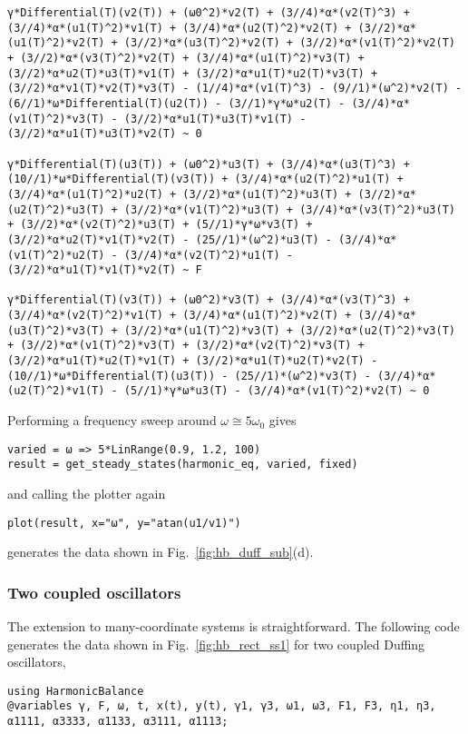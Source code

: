 \begin{lstlisting}[numbers=none, basicstyle=\scriptsize\ttfamily]
γ*Differential(T)(v2(T)) + (ω0^2)*v2(T) + (3//4)*α*(v2(T)^3) + (3//4)*α*(u1(T)^2)*v1(T) + (3//4)*α*(u2(T)^2)*v2(T) + (3//2)*α*(u1(T)^2)*v2(T) + (3//2)*α*(u3(T)^2)*v2(T) + (3//2)*α*(v1(T)^2)*v2(T) + (3//2)*α*(v3(T)^2)*v2(T) + (3//4)*α*(u1(T)^2)*v3(T) + (3//2)*α*u2(T)*u3(T)*v1(T) + (3//2)*α*u1(T)*u2(T)*v3(T) + (3//2)*α*v1(T)*v2(T)*v3(T) - (1//4)*α*(v1(T)^3) - (9//1)*(ω^2)*v2(T) - (6//1)*ω*Differential(T)(u2(T)) - (3//1)*γ*ω*u2(T) - (3//4)*α*(v1(T)^2)*v3(T) - (3//2)*α*u1(T)*u3(T)*v1(T) - (3//2)*α*u1(T)*u3(T)*v2(T) ~ 0

γ*Differential(T)(u3(T)) + (ω0^2)*u3(T) + (3//4)*α*(u3(T)^3) + (10//1)*ω*Differential(T)(v3(T)) + (3//4)*α*(u2(T)^2)*u1(T) + (3//4)*α*(u1(T)^2)*u2(T) + (3//2)*α*(u1(T)^2)*u3(T) + (3//2)*α*(u2(T)^2)*u3(T) + (3//2)*α*(v1(T)^2)*u3(T) + (3//4)*α*(v3(T)^2)*u3(T) + (3//2)*α*(v2(T)^2)*u3(T) + (5//1)*γ*ω*v3(T) + (3//2)*α*u2(T)*v1(T)*v2(T) - (25//1)*(ω^2)*u3(T) - (3//4)*α*(v1(T)^2)*u2(T) - (3//4)*α*(v2(T)^2)*u1(T) - (3//2)*α*u1(T)*v1(T)*v2(T) ~ F

γ*Differential(T)(v3(T)) + (ω0^2)*v3(T) + (3//4)*α*(v3(T)^3) + (3//4)*α*(v2(T)^2)*v1(T) + (3//4)*α*(u1(T)^2)*v2(T) + (3//4)*α*(u3(T)^2)*v3(T) + (3//2)*α*(u1(T)^2)*v3(T) + (3//2)*α*(u2(T)^2)*v3(T) + (3//2)*α*(v1(T)^2)*v3(T) + (3//2)*α*(v2(T)^2)*v3(T) + (3//2)*α*u1(T)*u2(T)*v1(T) + (3//2)*α*u1(T)*u2(T)*v2(T) - (10//1)*ω*Differential(T)(u3(T)) - (25//1)*(ω^2)*v3(T) - (3//4)*α*(u2(T)^2)*v1(T) - (5//1)*γ*ω*u3(T) - (3//4)*α*(v1(T)^2)*v2(T) ~ 0
\end{lstlisting}

Performing a frequency sweep around $\omega \cong 5 \omega_0$ gives
%
\begin{lstlisting}[numbers=none]
varied = ω => 5*LinRange(0.9, 1.2, 100)
result = get_steady_states(harmonic_eq, varied, fixed)
\end{lstlisting}
%
and calling the plotter again
\begin{lstlisting}[numbers=none]
plot(result, x="ω", y="atan(u1/v1)")
\end{lstlisting}
generates the data shown in Fig.~\ref{fig:hb_duff_sub}(d).

\subsubsection{Two coupled oscillators} 

The extension to many-coordinate systems is straightforward. The following code generates the data shown in Fig.~\ref{fig:hb_rect_ss1} for two coupled Duffing oscillators,
\begin{lstlisting}[numbers=none]
using HarmonicBalance
@variables γ, F, ω, t, x(t), y(t), γ1, γ3, ω1, ω3, F1, F3, η1, η3, α1111, α3333, α1133, α3111, α1113;
\end{lstlisting}

